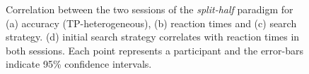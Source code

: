 \documentclass[]{rsos}%
\begin{document}
\begin{figure}
\centering
{}
\caption{Correlation between the two sessions of the \textit{split-half} paradigm for (a)  accuracy (TP-heterogeneous), (b) reaction times and (c) search strategy. (d) initial search strategy correlates with reaction times in both sessions. Each point represents a participant and the error-bars indicate 95\% confidence intervals.}
\label{fig:splithalf_summary}
\end{figure}
\end{document}
